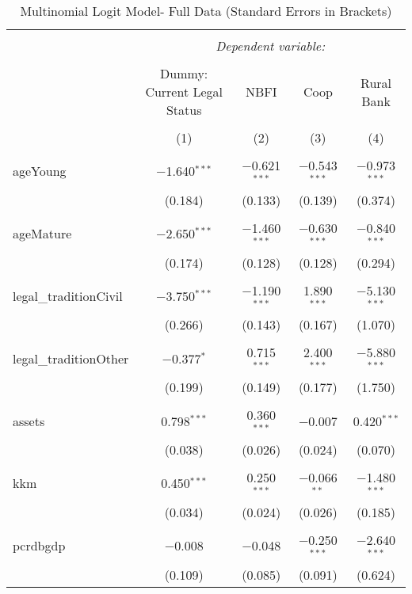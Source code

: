 \documentclass[a4paper,nobind]{templates/ociamthesis}
\begin{document}
\begin{table}[!htbp] \centering 
  \caption{Multinomial Logit Model- Full Data (Standard Errors in Brackets)} 
  \label{} 
\footnotesize 
\begin{tabular}{@{\extracolsep{5pt}}lcccc} 
\\[-1.8ex]\hline 
\hline \\[-1.8ex] 
 & \multicolumn{4}{c}{\textit{Dependent variable:}} \\ 
\cline{2-5} 
\\[-1.8ex] & Dummy: Current Legal Status & NBFI & Coop & Rural Bank \\ 
\\[-1.8ex] & (1) & (2) & (3) & (4)\\ 
\hline \\[-1.8ex] 
 ageYoung & $-$1.640$^{***}$ & $-$0.621$^{***}$ & $-$0.543$^{***}$ & $-$0.973$^{***}$ \\ 
  & (0.184) & (0.133) & (0.139) & (0.374) \\ 
  & & & & \\ 
 ageMature & $-$2.650$^{***}$ & $-$1.460$^{***}$ & $-$0.630$^{***}$ & $-$0.840$^{***}$ \\ 
  & (0.174) & (0.128) & (0.128) & (0.294) \\ 
  & & & & \\ 
 legal\_traditionCivil & $-$3.750$^{***}$ & $-$1.190$^{***}$ & 1.890$^{***}$ & $-$5.130$^{***}$ \\ 
  & (0.266) & (0.143) & (0.167) & (1.070) \\ 
  & & & & \\ 
 legal\_traditionOther & $-$0.377$^{*}$ & 0.715$^{***}$ & 2.400$^{***}$ & $-$5.880$^{***}$ \\ 
  & (0.199) & (0.149) & (0.177) & (1.750) \\ 
  & & & & \\ 
 assets & 0.798$^{***}$ & 0.360$^{***}$ & $-$0.007 & 0.420$^{***}$ \\ 
  & (0.038) & (0.026) & (0.024) & (0.070) \\ 
  & & & & \\ 
 kkm & 0.450$^{***}$ & 0.250$^{***}$ & $-$0.066$^{**}$ & $-$1.480$^{***}$ \\ 
  & (0.034) & (0.024) & (0.026) & (0.185) \\ 
  & & & & \\ 
 pcrdbgdp & $-$0.008 & $-$0.048 & $-$0.250$^{***}$ & $-$2.640$^{***}$ \\ 
  & (0.109) & (0.085) & (0.091) & (0.624) \\ 

\end{tabular}
\end{table}
\end{document}
